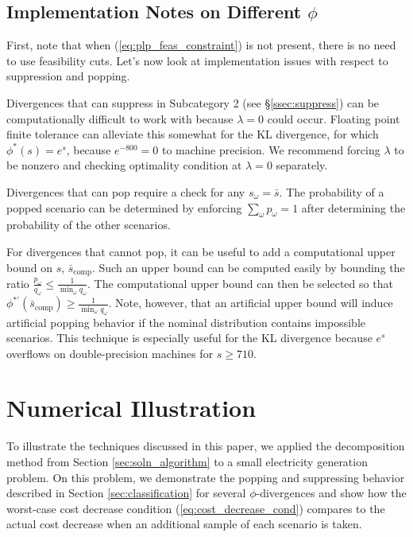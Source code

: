 \documentclass[opre,nonblindrev]{informs3} %
\begin{document}
\subsection{Implementation Notes on Different $\phi$}
\label{ssec:implement}

First, note that when (\ref{eq:plp_feas_constraint}) is not present, there is no need to use feasibility cuts. Let's now look at implementation issues with respect to suppression and popping. 

Divergences that can suppress in Subcategory 2 (see \S \ref{ssec:suppress}) can be computationally difficult to work with because $\lambda = 0$ could occur.
Floating point finite tolerance can alleviate this somewhat for the KL divergence, for which $\phi^*(s) = e^s$, because $e^{-800} = 0$ to machine precision.
We recommend forcing $\lambda$ to be nonzero and checking optimality condition at $\lambda = 0$ separately.

Divergences that can pop require a check for any $s_\omega = \bar{s}$.
The probability of a popped scenario can be determined by enforcing $\sum_\omega p_\omega = 1$ after determining the probability of the other scenarios.

For divergences that cannot pop, it can be useful to add a computational upper bound on $s$, $\bar{s}_\text{comp}$.
Such an upper bound can be computed easily by bounding the ratio $\frac{p_\omega}{q_\omega} \leq \frac{1}{\min_\omega q_\omega}$.
The computational upper bound can then be selected so that $\phi^{*\prime}(\bar{s}_\text{comp}) \geq \frac{1}{\min_\omega q_\omega}$.
Note, however, that an artificial upper bound will induce artificial popping behavior if the nominal distribution contains impossible scenarios.
This technique is especially useful for the KL divergence because $e^s$ overflows on double-precision machines for $s \geq 710$.



\section{Numerical Illustration} \label{sec:comp_results}

To illustrate the techniques discussed in this paper, we applied the decomposition method from Section \ref{sec:soln_algorithm} to a small electricity generation problem.
On this problem, we demonstrate the popping and suppressing behavior described in Section \ref{sec:classification} for several $\phi$-divergences and show how the worst-case cost decrease condition (\ref{eq:cost_decrease_cond}) compares to the actual cost decrease when an additional sample of each scenario is taken.
\end{document}
